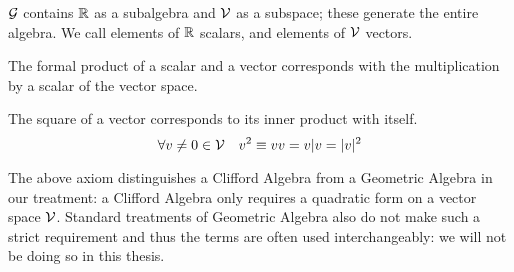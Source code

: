 \begin{axiom}\label{a:ga-axiom1}
    $\mathcal{G}$ contains $\mathbb{R}$ as a subalgebra and $\mathcal{V}$ as a subspace; these generate the entire algebra. We call elements of $\mathbb{R}$ scalars, and elements of $\mathcal{V}$ vectors.
\end{axiom}

\begin{axiom}\label{a:ga-axiom2}
	The formal product of a scalar and a vector corresponds with the multiplication by a scalar of the vector space.
\end{axiom}

\begin{axiom}\label{a:ga-axiom3}
    The square of a vector corresponds to its inner product with itself.
	\[\forall v \neq 0 \in \mathcal{V} \quad v^2 \equiv vv = v|v = |v|^2\]
\end{axiom}


\begin{remark}\label{r:ga-axiom3}
	The above axiom distinguishes a Clifford Algebra from a Geometric Algebra in our treatment: a Clifford Algebra only requires a quadratic form on a vector space $\mathcal{V}$. Standard treatments of Geometric Algebra also do not make such a strict requirement and thus the terms are often used interchangeably: we will not be doing so in this thesis.
\end{remark}

